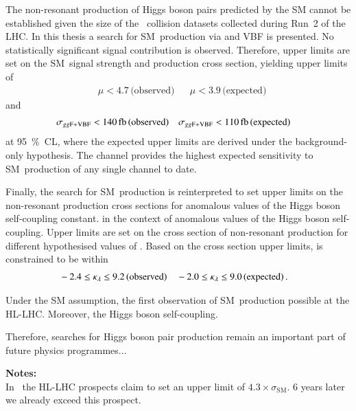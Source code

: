 The non-resonant production of Higgs boson pairs predicted by the SM cannot be
established given the size of the \pp~collision datasets collected during Run~2
of the LHC. In this thesis a search for SM~\HH production via \ggF and VBF is
presented. No statistically significant signal contribution is
observed. Therefore, upper limits are set on the SM~\HH signal strength and
production cross section, yielding upper limits of
\begin{align*}
  &\mu  < 4.7 \, \text{(observed)} && \mu < 3.9\,\text{(expected)}
\end{align*}
and
\begin{align*}
  &\xsecggfvbf < \SI{140}{\femto\barn} \,\text{(observed)} && \xsecggfvbf < \SI{110}{\femto\barn} \,\text{(expected)}
\end{align*}
at \SI{95}{\percent}~CL, where the expected upper limits are derived under the
background-only hypothesis. The \bbtautau channel provides the highest expected
sensitivity to SM~\HH production of any single channel to date.

Finally, the search for SM~\HH production is reinterpreted to set upper limits
on the non-resonant \HH production cross sections for anomalous values of the
Higgs boson self-coupling constant.
in the context of
anomalous values of the Higgs boson self-coupling. Upper limits are set on the
cross section of non-resonant \HH production for different hypothesised values
of \klambda. Based on the cross section upper limits, \klambda is constrained to
be within
\begin{align*}
  &-2.4 \leq \kappa_{\lambda} \leq 9.2 \,\text{(observed)} && -2.0 \leq \kappa_{\lambda} \leq 9.0 \,\text{(expected)} \,\text{.}
\end{align*}


Under the SM assumption, the first observation of SM~\HH production possible at
the HL-LHC. Moreover, the Higgs boson self-coupling.

Therefore, searches for Higgs boson pair production remain an important part of
future physics programmes...


\vspace{10em}\noindent\textbf{Notes:}\\

In~\cite{ATL-PHYS-PUB-2015-046} the HL-LHC prospects claim to set an
upper limit of $4.3 \times \sigma_\text{SM}$. 6 years later we already
exceed this prospect.

